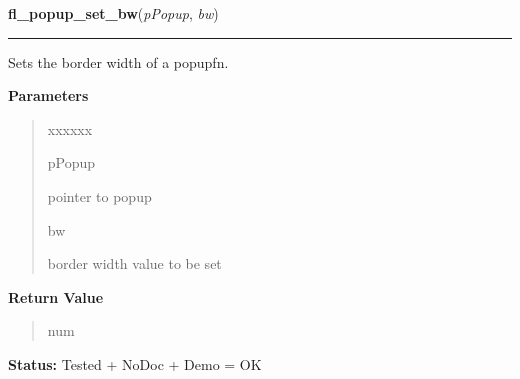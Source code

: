 \hspace{.8\funcindent}\begin{boxedminipage}{\funcwidth}

    \raggedright \textbf{fl\_popup\_set\_bw}(\textit{pPopup}, \textit{bw})

    \vspace{-1.5ex}

    \rule{\textwidth}{0.5\fboxrule}
\setlength{\parskip}{2ex}
    Sets the border width of a popupfn.

\setlength{\parskip}{1ex}
      \textbf{Parameters}
      \vspace{-1ex}

      \begin{quote}
        \begin{Ventry}{xxxxxx}

          \item[pPopup]

          pointer to popup

          \item[bw]

          border width value to be set

        \end{Ventry}

      \end{quote}

      \textbf{Return Value}
    \vspace{-1ex}

      \begin{quote}
      num

      \end{quote}

\textbf{Status:} Tested + NoDoc + Demo = OK



    \end{boxedminipage}

    \label{xformslib:flpopup:fl_popup_get_color}

    \vspace{0.5ex}

